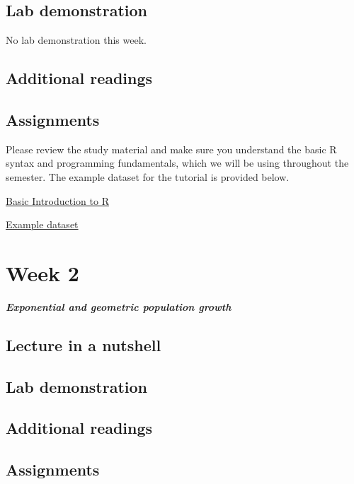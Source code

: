 \documentclass[
]{book}
\begin{document}
\hypertarget{lab-demonstration}{%
\section*{Lab demonstration}\label{lab-demonstration}}

No lab demonstration this week.

\hypertarget{additional-readings}{%
\section*{Additional readings}\label{additional-readings}}

\hypertarget{assignments}{%
\section*{Assignments}\label{assignments}}

Please review the study material and make sure you understand the basic R syntax and programming fundamentals, which we will be using throughout the semester. The example dataset for the tutorial is provided below.

\href{./Assignments/Week1_Basic\%20Introduction\%20to\%20R.pdf}{Basic Introduction to R}

\href{./Assignments/example_dat.txt}{Example dataset}

\hypertarget{week-2}{%
\chapter*{Week 2}\label{week-2}}

\textbf{\emph{Exponential and geometric population growth}}

\hypertarget{lecture-in-a-nutshell-1}{%
\section*{Lecture in a nutshell}\label{lecture-in-a-nutshell-1}}

\hypertarget{lab-demonstration-1}{%
\section*{Lab demonstration}\label{lab-demonstration-1}}

\hypertarget{additional-readings-1}{%
\section*{Additional readings}\label{additional-readings-1}}

\hypertarget{assignments-1}{%
\section*{Assignments}\label{assignments-1}}

  
\end{document}
